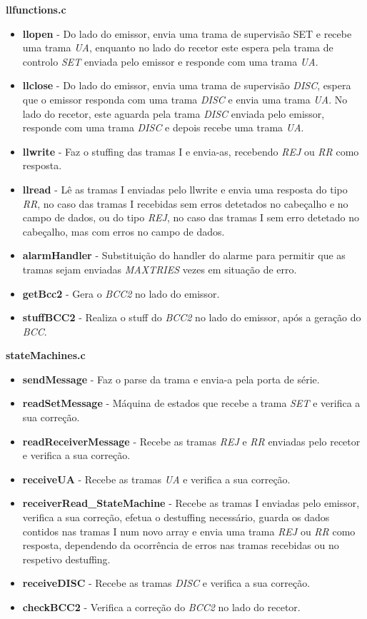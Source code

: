 \documentclass[11pt]{article}
\begin{document}
\textbf{llfunctions.c}
\begin{itemize}
	\item \textbf{llopen} - Do lado do emissor, envia uma trama de supervisão SET e recebe uma trama \textit{UA}, enquanto no lado do recetor este espera pela trama de controlo \textit{SET} enviada pelo emissor e responde com uma trama \textit{UA}.
	\item \textbf{llclose} -  Do lado do emissor, envia uma trama de supervisão \textit{DISC}, espera que o emissor responda com uma trama \textit{DISC} e envia uma trama \textit{UA}. No lado do recetor, este aguarda pela trama \textit{DISC} enviada pelo emissor, responde com uma trama \textit{DISC} e depois recebe uma trama \textit{UA}.
	\item \textbf{llwrite} - Faz o stuffing das tramas I e envia-as, recebendo \textit{REJ} ou \textit{RR} como resposta.
	\item \textbf{llread} - Lê as tramas I enviadas pelo llwrite e envia uma resposta do tipo \textit{RR}, no caso das tramas I recebidas sem erros detetados no cabeçalho e no campo de dados, ou do tipo \textit{REJ}, no caso das tramas I sem erro detetado no cabeçalho, mas com erros no campo de dados.
	\item \textbf{alarmHandler} - Substituição do handler do alarme para permitir que as tramas sejam enviadas \textit{MAXTRIES} vezes em situação de erro.
	\item \textbf{getBcc2} - Gera o \textit{BCC2} no lado do emissor.
	\item \textbf{stuffBCC2} - Realiza o stuff do \textit{BCC2} no lado do emissor, após a geração do \textit{BCC}.
	
\end{itemize}


\textbf{stateMachines.c}
\begin{itemize}
	\item \textbf{sendMessage } - Faz o parse da trama e envia-a pela porta de série.
	\item \textbf{readSetMessage } -  Máquina de estados que recebe a trama \textit{SET} e verifica a sua correção.
	\item \textbf{readReceiverMessage } - Recebe as tramas \textit{REJ} e \textit{RR} enviadas pelo recetor e verifica a sua correção.
	\item \textbf{receiveUA} - Recebe as tramas \textit{UA} e verifica a sua correção.
	
	\item \textbf{receiverRead\_StateMachine} - Recebe as tramas I enviadas pelo emissor, verifica a sua correção, efetua o destuffing necessário, guarda os dados contidos nas tramas I num novo array e envia uma trama \textit{REJ} ou \textit{RR} como resposta, dependendo da ocorrência de erros nas tramas recebidas ou no respetivo destuffing.
	\item \textbf{receiveDISC } - Recebe as tramas \textit{DISC} e verifica a sua correção.
	\item \textbf{checkBCC2 } - Verifica a correção do \textit{BCC2} no lado do recetor.
\end{itemize}
\end{document}
